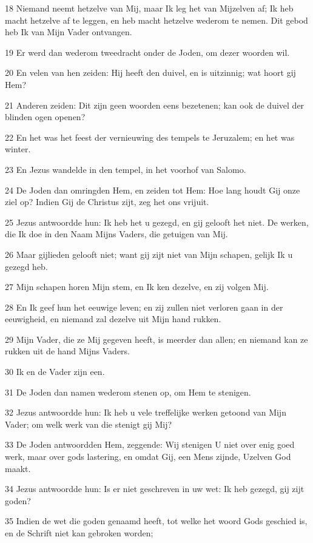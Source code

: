 \par 18 Niemand neemt hetzelve van Mij, maar Ik leg het van Mijzelven af; Ik heb macht hetzelve af te leggen, en heb macht hetzelve wederom te nemen. Dit gebod heb Ik van Mijn Vader ontvangen.
\par 19 Er werd dan wederom tweedracht onder de Joden, om dezer woorden wil.
\par 20 En velen van hen zeiden: Hij heeft den duivel, en is uitzinnig; wat hoort gij Hem?
\par 21 Anderen zeiden: Dit zijn geen woorden eens bezetenen; kan ook de duivel der blinden ogen openen?
\par 22 En het was het feest der vernieuwing des tempels te Jeruzalem; en het was winter.
\par 23 En Jezus wandelde in den tempel, in het voorhof van Salomo.
\par 24 De Joden dan omringden Hem, en zeiden tot Hem: Hoe lang houdt Gij onze ziel op? Indien Gij de Christus zijt, zeg het ons vrijuit.
\par 25 Jezus antwoordde hun: Ik heb het u gezegd, en gij gelooft het niet. De werken, die Ik doe in den Naam Mijns Vaders, die getuigen van Mij.
\par 26 Maar gijlieden gelooft niet; want gij zijt niet van Mijn schapen, gelijk Ik u gezegd heb.
\par 27 Mijn schapen horen Mijn stem, en Ik ken dezelve, en zij volgen Mij.
\par 28 En Ik geef hun het eeuwige leven; en zij zullen niet verloren gaan in der eeuwigheid, en niemand zal dezelve uit Mijn hand rukken.
\par 29 Mijn Vader, die ze Mij gegeven heeft, is meerder dan allen; en niemand kan ze rukken uit de hand Mijns Vaders.
\par 30 Ik en de Vader zijn een.
\par 31 De Joden dan namen wederom stenen op, om Hem te stenigen.
\par 32 Jezus antwoordde hun: Ik heb u vele treffelijke werken getoond van Mijn Vader; om welk werk van die stenigt gij Mij?
\par 33 De Joden antwoordden Hem, zeggende: Wij stenigen U niet over enig goed werk, maar over gods lastering, en omdat Gij, een Mens zijnde, Uzelven God maakt.
\par 34 Jezus antwoordde hun: Is er niet geschreven in uw wet: Ik heb gezegd, gij zijt goden?
\par 35 Indien de wet die goden genaamd heeft, tot welke het woord Gods geschied is, en de Schrift niet kan gebroken worden;

